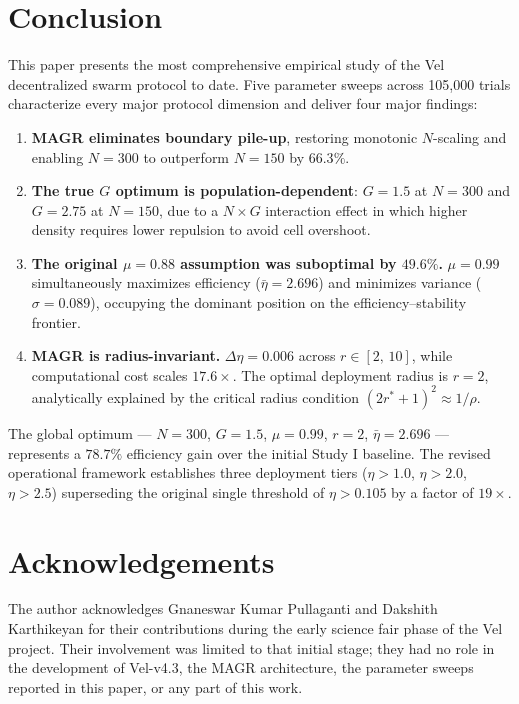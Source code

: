 \documentclass[journal,compsoc]{IEEEtran}
\begin{document}
\section{Conclusion}
\label{sec:conclusion}

This paper presents the most comprehensive empirical study of the Vel decentralized
swarm protocol to date. Five parameter sweeps across 105{,}000 trials characterize
every major protocol dimension and deliver four major findings:

\begin{enumerate}
    \item \textbf{MAGR eliminates boundary pile-up}, restoring monotonic $N$-scaling
          and enabling $N=300$ to outperform $N=150$ by $66.3\%$.
    \item \textbf{The true $G$ optimum is population-dependent}: $G=1.5$ at $N=300$
          and $G=2.75$ at $N=150$, due to a $N\times G$ interaction effect in which
          higher density requires lower repulsion to avoid cell overshoot.
    \item \textbf{The original $\mu=0.88$ assumption was suboptimal by $49.6\%$.}
          $\mu=0.99$ simultaneously maximizes efficiency ($\bar{\eta}=2.696$) and
          minimizes variance ($\sigma=0.089$), occupying the dominant position on the
          efficiency--stability frontier.
    \item \textbf{MAGR is radius-invariant.} $\Delta\eta=0.006$ across $r\in[2,\,10]$,
          while computational cost scales $17.6\times$. The optimal deployment radius
          is $r=2$, analytically explained by the critical radius condition
          $(2r^*+1)^2 \approx 1/\rho$.
\end{enumerate}

The global optimum --- $N=300$, $G=1.5$, $\mu=0.99$, $r=2$, $\bar{\eta}=2.696$ ---
represents a $78.7\%$ efficiency gain over the initial Study I baseline. The revised
operational framework establishes three deployment tiers ($\eta>1.0$, $\eta>2.0$,
$\eta>2.5$) superseding the original single threshold of $\eta>0.105$ by a factor
of $19\times$.

\section*{Acknowledgements}
The author acknowledges Gnaneswar Kumar Pullaganti and Dakshith Karthikeyan for their
contributions during the early science fair phase of the Vel project. Their involvement
was limited to that initial stage; they had no role in the development of Vel-v4.3,
the MAGR architecture, the parameter sweeps reported in this paper, or any part of
this work.
\end{document}
